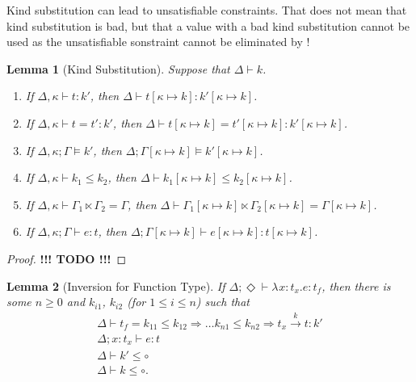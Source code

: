 \documentclass{article}
\newcommand{\KVAR}{\kappa}
\newcommand{\ONE}{\circ}
\newcommand{\TASS}[1]{#1\colon\!}
\newcommand{\LAM}[3][{}]{\lambda^{#1}\TASS{#2}#3.}
\newcommand{\KENV}{\Delta}
\newcommand{\TENV}{\Gamma}
\newcommand{\TENVEMPTY}{\Diamond}
\newcommand{\SPLIT}[3]{#1 \ltimes #2 = #3} %
\newtheorem{lemma}{Lemma}
\begin{document}
Kind substitution can lead to unsatisfiable constraints. That does not
mean that kind substitution is bad, but that a value with a bad kind
substitution cannot be used as the unsatisfiable sonstraint cannot be
eliminated by !
\begin{lemma}[Kind Substitution]\label{lemma:kind-substitution}
  Suppose that $\KENV \vdash k$.
  \begin{enumerate}
  \item If $\KENV, \KVAR \vdash t : k'$,
    then $\KENV \vdash t[\KVAR \mapsto k] : k'[\KVAR \mapsto k]$.
  \item If $\KENV, \KVAR \vdash t = t' : k'$,
    then $\KENV \vdash t[\KVAR \mapsto k] = t'[\KVAR \mapsto k] : k'[\KVAR \mapsto k]$.
  \item If $\KENV, \KVAR ; \TENV \models k'$,
    then $\KENV; \TENV[\KVAR \mapsto k] \models k'[\KVAR \mapsto k]$.
  \item If $\KENV,\KVAR \vdash k_1 \le k_2$,
    then $\KENV \vdash k_1[\KVAR \mapsto k] \le k_2[\KVAR \mapsto k]$.
  \item If $\KENV, \KVAR \vdash \SPLIT{\TENV_1}{\TENV_2}{\TENV}$,
    then $\KENV \vdash \SPLIT{\TENV_1[\KVAR \mapsto k]}{\TENV_2[\KVAR \mapsto k]}{\TENV[\KVAR \mapsto k]}$. 
  \item If $\KENV, \KVAR; \TENV \vdash e : t$,
    then $\KENV; \TENV[\KVAR \mapsto k] \vdash e[\KVAR \mapsto k] : t[\KVAR \mapsto k]$.
  \end{enumerate}
\end{lemma}
\begin{proof}
  \textbf{!!! TODO !!!}
\end{proof}
\begin{lemma}[Inversion for Function Type]\label{lemma:inversion-function}
  If $\KENV; \TENVEMPTY \vdash \LAM x {t_x} e : t_f$,
  then there is some $n\ge0$ and $k_{i1}$, $k_{i2}$ (for $1\le i\le n$) such that 
  \begin{gather}
    \KENV \vdash t_f = k_{11}\le k_{12}\Rightarrow \dots k_{n1}\le k_{n2} \Rightarrow t_x \stackrel{k}\to t : k'
    \\
    \KENV; \TASS x{t_x} \vdash e : t
    \\
    \KENV \vdash k' \le \ONE
    \\
    \KENV \vdash k \le \ONE
    \mathrm{.}
  \end{gather}
\end{lemma}
\end{document}
